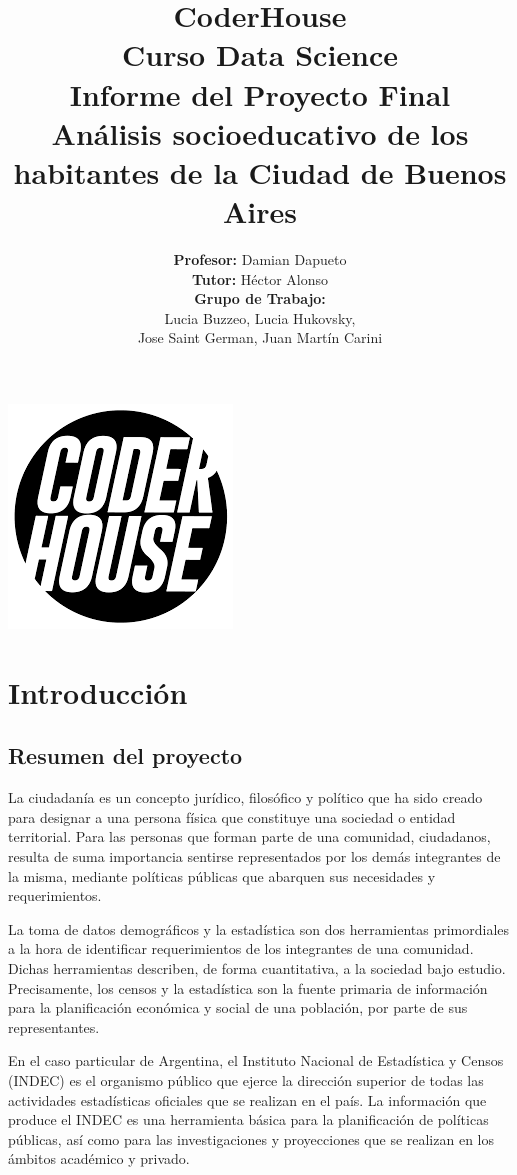 \documentclass[a4paper]{article}
\title{\textbf{CoderHouse \\ \vspace{0.5cm} Curso Data Science \\ \vspace{0.5cm} Informe del Proyecto Final\\ \vspace{0.5cm}
Análisis socioeducativo de los habitantes de la Ciudad de Buenos Aires}}
\author{\textbf{Profesor:} Damian Dapueto \\ \vspace{0.2cm} \textbf{Tutor:} Héctor Alonso \\ \vspace{0.2cm} \textbf{Grupo de Trabajo:} \\ Lucia Buzzeo, Lucia Hukovsky,\\ Jose Saint German, Juan Martín Carini}
\begin{document}
\maketitle

\begin{center}
    \includegraphics[scale=1.75]{Imagenes/Coder.jpg}
\end{center}
 
\thispagestyle{empty}
 
\newpage
 
\tableofcontents
 
\newpage

\section{Introducción}

    \subsection{Resumen del proyecto}

        La ciudadanía es un concepto jurídico, filosófico y político que ha sido creado para designar a una persona física que constituye una sociedad o entidad territorial. Para las personas que forman parte de una comunidad, ciudadanos, resulta de suma importancia sentirse representados por los demás integrantes de la misma, mediante políticas públicas que abarquen sus necesidades y requerimientos. 

        La toma de datos demográficos y la estadística son dos herramientas primordiales a la hora de identificar requerimientos de los integrantes de una comunidad. Dichas herramientas describen, de forma cuantitativa, a la sociedad bajo estudio. Precisamente, los censos y la estadística son la fuente primaria de información para la planificación económica y social de una población, por parte de sus representantes.

        En el caso particular de Argentina, el Instituto Nacional de Estadística y Censos (INDEC) es el organismo público que ejerce la dirección superior de todas las actividades estadísticas oficiales que se realizan en el país. La información que produce el INDEC es una herramienta básica para la planificación de políticas públicas, así como para las investigaciones y proyecciones que se realizan en los ámbitos académico y privado.
\end{document}
